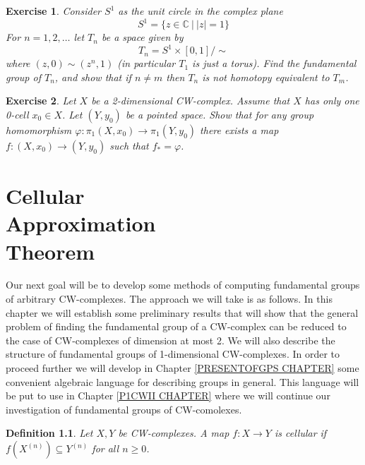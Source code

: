 \documentclass[11pt, letterpaper, oneside]{report}
\renewcommand{\chaptermark}[1]{\markboth{#1}{}}
\theoremstyle{pplain}
\theoremstyle{ddefinition}
\newtheorem{definition}[theorem]{Definition}
\theoremstyle{nnn}
\theoremstyle{eexercise}
\newtheorem{exercise}{Exercise}[chapter]
\newcommand{\C}{{\mathbb C}}
\begin{document}
\begin{exercise}
Consider $S^{1}$ as the unit circle in the complex plane 
$$S^{1} = \{z \in \C \  | \ \vert z\vert = 1 \}$$
For $n = 1, 2, \dots$ let $T_{n}$ be a space given by 
$$T_{n} = S^{1}\times [0, 1]/{\sim}$$
where $(z,0)\sim (z^{n}, 1)$ (in particular $T_{1}$ is just a torus). Find the fundamental group of $T_{n}$, and 
show that if $n\neq m$ then $T_{n}$ is not homotopy equivalent to $T_{m}$. 
\end{exercise}

\begin{exercise}
Let $X$ be a 2-dimensional CW-complex. Assume that $X$ has only one 0-cell $x_{0}\in X$.  
Let $(Y, y_{0})$ be a pointed space.  Show that for any group homomorphism 
$\varphi \colon \pi_{1}(X, x_{0}) \to \pi_{1}(Y, y_{0})$ there exists 
a map $f\colon (X, x_{0}) \to (Y, y_{0})$ such that $f_{\ast} = \varphi$. 
\end{exercise}




\newpage

\chapter[Cellular Approximation Theorem]{Cellular \\ Approximation \\ Theorem}
\chaptermark{Cellular Approximation Theorem}
\label{P1CWI CHAPTER}
\thispagestyle{firststyle}

Our next goal will be to develop some methods of computing  fundamental groups of 
arbitrary CW-complexes. The approach we will take is as follows. In this chapter we will establish 
some preliminary results that will  show that the general problem of finding 
the fundamental group of a CW-complex can be reduced to the case of 
CW-complexes of dimension at most 2. We will also describe the structure of fundamental groups 
of 1-dimensional CW-complexes. In order to proceed further we will develop in Chapter 
\ref{PRESENTOFGPS CHAPTER} some convenient algebraic language for describing  
groups in general. This language will be put to use in Chapter \ref{P1CWII CHAPTER} where we will 
continue our investigation of fundamental groups of CW-comolexes. 

\begin{definition}
Let $X, Y$ be CW-complexes. A map $f\colon X \to Y$ is \emph{cellular} if $f(X^{(n)}) \subseteq Y^{(n)}$
for all $n\geq 0$. 
\end{definition}
\end{document}
